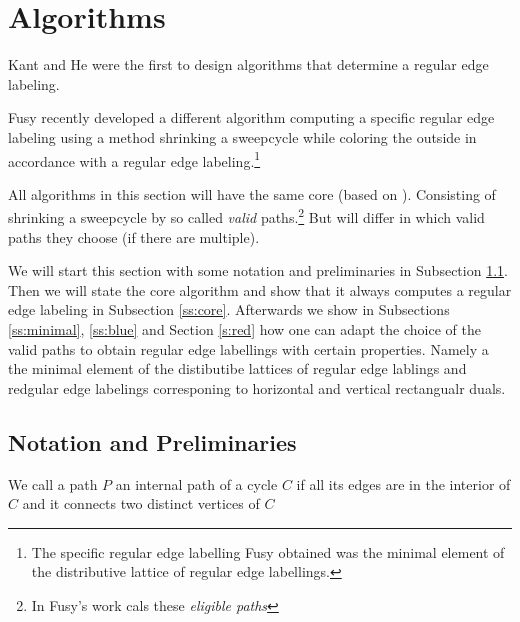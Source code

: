 
\newenvironment{invariants}{%
  \refstepcounter{thrm}%
  \paragraph{Invariants~\theprop}%
  \renewcommand*{\theenumi}{\theprop\,(I\arabic{enumi})}%
  \renewcommand*{\labelenumi}{(I\arabic{enumi})}%
  \enumerate
}{%
  \endenumerate
}

\section{Algorithms}
Kant and He \cite{Kant1997} were the first to design algorithms that determine a regular edge labeling.

Fusy \cite{Fusy2006} recently developed a different algorithm computing a specific regular edge labeling using a method shrinking a sweepcycle while coloring the outside in accordance with a regular edge labeling.\footnote{The specific regular edge labelling Fusy obtained was the minimal element of the distributive lattice of regular edge labellings.}

All algorithms in this section will have the same core (based on \cite{Fusy2006}). Consisting of shrinking a sweepcycle by so called \emph{valid} paths.\footnote{In Fusy's work cals these \emph{eligible paths}} But will differ in which valid paths they choose (if there are multiple).

We will start this section with some notation and preliminaries in Subsection \ref{ss:not}. Then we will state the core algorithm and show that it always computes a regular edge labeling in Subsection \ref{ss:core}. Afterwards we show in Subsections \ref{ss:minimal}, \ref{ss:blue} and Section \ref{s:red} how one can adapt the choice of the valid paths to obtain regular edge labellings with certain properties. Namely a the minimal element of the distibutibe lattices of regular edge lablings and redgular edge labelings corresponing to horizontal and vertical rectangualr duals.


\subsection{Notation and Preliminaries}
\label{ss:not}
\begin{defi}
We call a path $P$ an internal path of a cycle $C$ if all its edges are in the interior of $C$ and it connects two distinct vertices of $C$
\end{defi}

